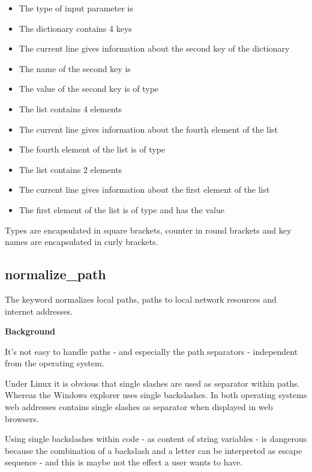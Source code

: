 \begin{itemize}
   \item The type of input parameter  is 
   \item The dictionary contains 4 keys
   \item The current line gives information about the second key of the dictionary
   \item The name of the second key is 
   \item The value of the second key is of type 
   \item The list contains 4 elements
   \item The current line gives information about the fourth element of the list
   \item The fourth element of the list is of type 
   \item The list contains 2 elements
   \item The current line gives information about the first element of the list
   \item The first element of the list is of type  and has the value 
\end{itemize}

Types are encapsulated in square brackets, counter in round brackets and key names are encapsulated in curly brackets.

\newpage

\subsection{normalize\_path}

The  keyword normalizes local paths, paths to local network resources and internet addresses.

\vspace{1ex}

\textbf{Background}

It's not easy to handle paths - and especially the path separators - independent from the operating system.

Under Linux it is obvious that single slashes are used as separator within paths. Whereas the Windows explorer
uses single backslashes. In both operating systems web addresses contains single slashes as separator
when displayed in web browsers.

Using single backslashes within code - as content of string variables - is dangerous because the combination
of a backslash and a letter can be interpreted as escape sequence - and this is maybe not the effect a user wants to have.

